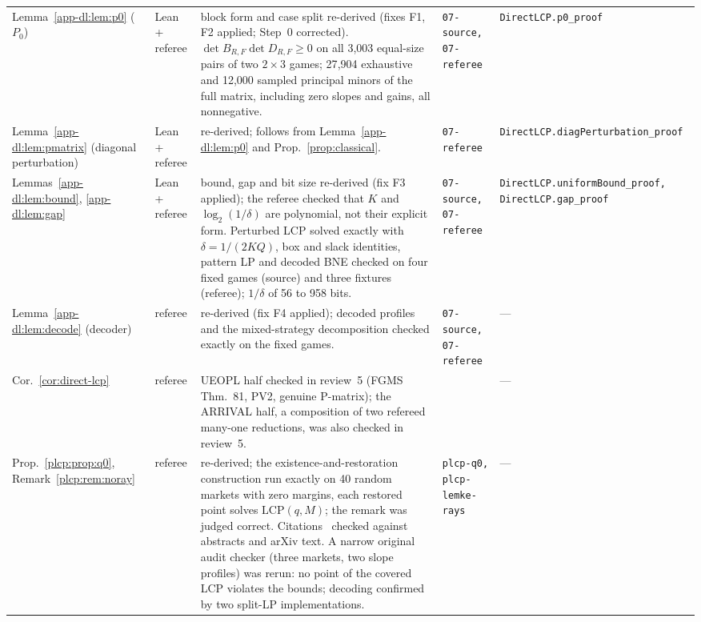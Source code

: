 \begin{longtable}{@{}p{2.7cm}p{1.1cm}p{4.2cm}p{3.75cm}p{3.05cm}@{}}
Lemma~\ref{app-dl:lem:p0} ($P_0$) & Lean + referee & block form and case split re-derived (fixes F1, F2 applied; Step~0 corrected). $\det B_{R,F}\det D_{R,F}\ge0$ on all 3{,}003 equal-size pairs of two $2\times3$ games; 27{,}904 exhaustive and 12{,}000 sampled principal minors of the full matrix, including zero slopes and gains, all nonnegative. & {\scriptsize\raggedright\texttt{07-source,\allowbreak{} 07-referee}\par} & {\scriptsize\raggedright\texttt{DirectLCP.\allowbreak{}p0\_proof}}\\
Lemma~\ref{app-dl:lem:pmatrix} (diagonal perturbation) & Lean + referee & re-derived; follows from Lemma~\ref{app-dl:lem:p0} and Prop.~\ref{prop:classical}. & {\scriptsize\raggedright\texttt{07-referee}\par} & {\scriptsize\raggedright\texttt{DirectLCP.\allowbreak{}diagPerturbation\_proof}}\\
Lemmas~\ref{app-dl:lem:bound}, \ref{app-dl:lem:gap} & Lean + referee & bound, gap and bit size re-derived (fix F3 applied); the referee checked that $K$ and $\log_2(1/\delta)$ are polynomial, not their explicit form. Perturbed LCP solved exactly with $\delta=1/(2KQ)$, box and slack identities, pattern LP and decoded BNE checked on four fixed games (source) and three fixtures (referee); $1/\delta$ of 56 to 958 bits. & {\scriptsize\raggedright\texttt{07-source,\allowbreak{} 07-referee}\par} & {\scriptsize\raggedright\texttt{DirectLCP.\allowbreak{}uniformBound\_proof,\allowbreak{} DirectLCP.\allowbreak{}gap\_proof}}\\
Lemma~\ref{app-dl:lem:decode} (decoder) & referee & re-derived (fix F4 applied); decoded profiles and the mixed-strategy decomposition checked exactly on the fixed games. & {\scriptsize\raggedright\texttt{07-source,\allowbreak{} 07-referee}\par} & ---\\
Cor.~\ref{cor:direct-lcp} & referee & UEOPL half checked in review~5 (FGMS Thm.~81, PV2, genuine P-matrix); the ARRIVAL half, a composition of two refereed many-one reductions, was also checked in review~5. &  & ---\\
Prop.~\ref{plcp:prop:q0}, Remark~\ref{plcp:rem:noray} & referee & re-derived; the existence-and-restoration construction run exactly on 40 random markets with zero margins, each restored point solves $\mathrm{LCP}(q,M)$; the remark was judged correct. Citations~\cite{ac87,av13} checked against abstracts and arXiv text. A narrow original audit checker (three markets, two slope profiles) was rerun: no point of the covered LCP violates the bounds; decoding confirmed by two split-LP implementations. & {\scriptsize\raggedright\texttt{plcp-q0,\allowbreak{} plcp-lemke-rays}\par} & ---\\

\end{longtable}
